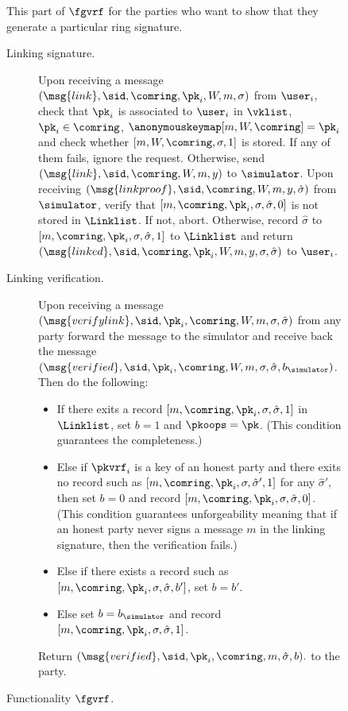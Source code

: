 \begin{figure}
	\begin{tcolorbox}
		{  This part of $ \fgvrf $ for the parties who want to show that they generate a particular ring signature.
			
		
			\begin{description}
				\item[Linking signature.] Upon receiving a message $(\msg{link}, \sid, \comring, \pk_i, W, m,\sigma)$ from $\user_i$, check that $\pk_i $ is associated to $\user_i$ in $ \vklist $, $ \pk_i \in \comring $, $ \anonymouskeymap[m,W, \comring] = \pk_i $ and 
				check whether $ [m, W,\comring, \sigma, 1] $ is stored. If any of them fails, ignore the request. Otherwise,
				send $(\msg{link}, \sid, \comring, W, m, y)$ to $\simulator$. Upon receiving $(\msg{linkproof}, \sid, \comring, W, m, y, \hat \sigma)$ from $\simulator$, verify that $ [m, \comring, \pk_i, \sigma, \hat{\sigma}, 0] $ is not stored in $ \Linklist $. If not, abort. Otherwise,  record $\hat\sigma$ to $[m, \comring, \pk_i,\sigma, \hat{\sigma}, 1]$ to $ \Linklist $ and return $(\msg{linked}, \sid, \comring, \pk_i,W, m, y,\sigma, \hat\sigma)$ to $\user_i$.
				\item[Linking verification.] Upon receiving a message $(\msg{verifylink}, \sid, \pk_i, \comring, W, m,\sigma,\hat\sigma)$ from any party forward the message to the simulator and receive back  the message $(\msg{verified}, \sid, \pk_i, \comring, W,m, \sigma,\hat\sigma,  b_{\simulator})$. Then do the following:
				
				\begin{itemize}
					\item If there exits a record $ [m, \comring,\pk_i,\sigma,\hat\sigma, 1] $ in $ \Linklist $, set $ b = 1 $ and $ \pkoops = \pk $. (This condition guarantees the completeness.)
					\item Else if $ \pkvrf_i $ is a key of an honest party and there exits no record such as $ [m, \comring,\pk_i,\sigma,\hat\sigma',  1] $ for any  $  \hat\sigma'$, then set $ b = 0 $ and record $ [m, \comring,\pk_i,\sigma,\hat\sigma,  0] $. (This condition guarantees unforgeability meaning that if an honest party never signs a message $ m $ in the linking signature, then the verification fails.)
					\item Else if there exists a record  such as $ [m, \comring,\pk_i,\sigma,\hat\sigma,  b'] $, set $ b = b' $. 
					\item Else set $ b = b_{\simulator} $ and record $ [m, \comring,\pk_i,\sigma,\hat\sigma,  1] $. 
				\end{itemize}
				
				Return $(\msg{verified}, \sid, \pk_i, \comring, m, \hat\sigma, b).$ to the party.
			\end{description}
		}
	\end{tcolorbox}
	\caption{Functionality $\fgvrf$.\label{f:gvrf}}
\end{figure}


